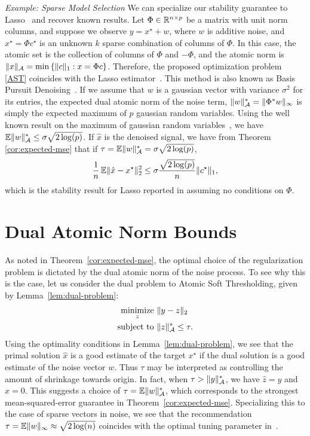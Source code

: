 \noindent\emph{Example: Sparse Model Selection} We can specialize our stability
guarantee to Lasso~\cite{tibshirani96} and recover known results. Let $\Phi \in
\mathbb{R}^{n \times p}$ be a matrix with unit norm columns, and suppose we observe
$y = x^\star + w$, where $w$ is additive noise, and $x^\star = \Phi
c^\star$ is an unknown $k$ sparse combination of columns of $\Phi$. In this
case, the atomic set is the collection of columns of $\Phi$ and $-\Phi$, and
the atomic norm is $\lVert x\rVert_{\mathcal{A}} = \min \left\{\lVert c\rVert_1: x = \Phi c\right\}$.
Therefore, the proposed optimization
problem \eqref{AST} coincides with the Lasso estimator~\cite{tibshirani96}.
This method is also known as Basis Pursuit Denoising~\cite{chen98}. If we
assume that $w$ is a gaussian vector with variance $\sigma^2$ for its entries,
the expected dual atomic norm of the noise term, $\lVert w\rVert_{\mathcal{A}}^* =
\lVert\Phi^*w\rVert_\infty$ is simply the expected maximum of $p$ gaussian random
variables. Using the well known result on the maximum of gaussian random
variables~\cite{lr76}, we have $\operatorname{\mathbb{E}}\lVert w\rVert_{\mathcal{A}}^* \leq \sigma \sqrt{2 \log(p)}$.
If $\hat{x}$ is the denoised signal, we have from Theorem
\ref{cor:expected-mse} that if $\tau = \operatorname{\mathbb{E}}\lVert w\rVert_{\mathcal{A}}^* = \sigma \sqrt{2
\log(p)}$, \[ \frac{1}{n}\operatorname{\mathbb{E}}\lVert\hat{x} - x^\star\rVert_2^2 \leq \sigma
\frac{\sqrt{2\log(p)} }{n} \lVert c^\star\rVert_1, \] which is the stability result
for Lasso reported in \cite{greenshtein04} assuming no conditions on $\Phi$.
\section{Dual Atomic Norm Bounds} %
\label{sec:dual-atomic-bounds}

As noted in Theorem~\ref{cor:expected-mse}, the optimal choice of the
regularization problem is dictated by the dual atomic norm of the noise process.
To see why this is the case, let us consider the dual problem to Atomic Soft
Thresholding, given by Lemma~\ref{lem:dual-problem}:
\begin{equation*}
  \begin{split} \mathop{\operatorname{minimize}}_z~&\lVert y - z\rVert_2\\
	 \text{subject to }&\lVert z\rVert_{\mathcal{A}}^* \leq \tau.
  \end{split}
\end{equation*} 
Using the optimality conditions in Lemma~\ref{lem:dual-problem}, we see that the
primal solution $\hat{x}$ is a good estimate of the target $x^\star$ if the dual
solution is a good estimate of the noise vector $w$. Thus $\tau$ may be
interpreted as controlling the amount of shrinkage towards origin. In fact, when
$\tau > \lVert y\rVert_{\mathcal{A}}^*$, we have $\hat{z} = y$ and $\hat{x} = 0.$ This suggests
a choice of $\tau = \operatorname{\mathbb{E}} \lVert w\rVert_{\mathcal{A}}^*$, which corresponds to the strongest
mean-squared-error guarantee in Theorem~\ref{cor:expected-mse}. Specializing
this to the case of sparse vectors in noise, we see that the recommendation $\tau = \operatorname{\mathbb{E}} \lVert w\rVert_\infty \approx \sqrt{2 \log(n)}$ coincides with the optimal tuning parameter in~\cite{donoho1995noising}.

